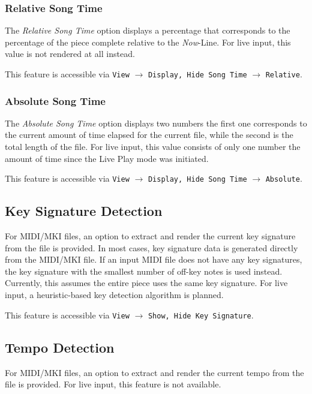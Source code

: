 \documentclass[english]{article}
\providecommand{\mi}[1]{\texttt{#1}}
\begin{document}
\subsubsection{Relative Song Time}

The \textit{Relative Song Time} option displays a percentage that corresponds to the percentage of the piece
complete relative to the \textit{Now}-Line. For live input, this value is not rendered at all instead.

This feature is accessible via 
\mi{View} $\rightarrow$ \mi{{Display, Hide} Song Time} $\rightarrow$ \mi{Relative}.

\subsubsection{Absolute Song Time}

The \textit{Absolute Song Time} option displays two numbers \textendash{} the first one corresponds to the 
current amount of time elapsed for the current file, while the second is the total length of the file.
For live input, this value consists of only one number \textendash{}
the amount of time since the Live Play mode was initiated.

This feature is accessible via 
\mi{View} $\rightarrow$ \mi{{Display, Hide} Song Time} $\rightarrow$ \mi{Absolute}.

\subsection{Key Signature Detection}

For MIDI/MKI files, an option to extract and render the current key signature from the file is provided. In most cases,
key signature data is generated directly from the MIDI/MKI file.
If an input MIDI file does not have any key signatures, the key signature with the smallest number of off-key notes
is used instead. Currently, this assumes the entire piece uses the same key signature. 
For live input, a heuristic-based key detection algorithm is planned.

This feature is accessible via 
\mi{View} $\rightarrow$ \mi{{Show, Hide} Key Signature}.

\subsection{Tempo Detection}

For MIDI/MKI files, an option to extract and render the current tempo from the file is provided. For live input,
this feature is not available.
\end{document}
